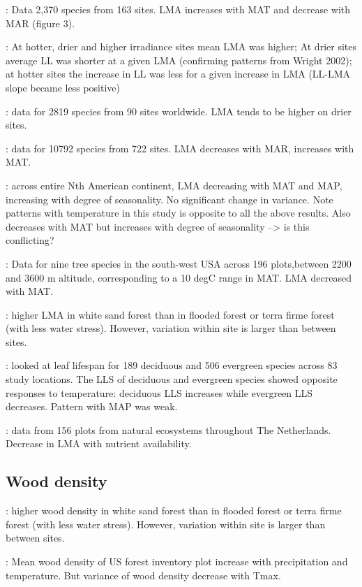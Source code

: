\documentclass[a4paper,11pt]{article}
\begin{document}
\citet{Wright-2004}: Data 2,370 species from 163 sites. LMA increases with MAT and decrease with MAR (figure 3).

\citet{Wright-2005}: At hotter, drier and higher irradiance sites mean LMA was higher; At drier sites average LL was shorter at a given LMA (confirming patterns from Wright 2002); at hotter sites the increase in LL was less for a given increase in LMA (LL-LMA slope became less positive)

\citet{Onoda-2011}: data for 2819 species from 90 sites worldwide. LMA tends to be higher on drier sites.

\citet{Moles-2014}: data for 10792 species from 722 sites. LMA decreases with MAR, increases with MAT.

\citet{Simova-2014}: across entire Nth American continent, LMA decreasing with MAT and MAP, increasing with degree of seasonality. No significant change in variance. Note patterns with temperature in this study is opposite to all the above results. Also decreases with MAT but increases with degree of seasonality --> is this conflicting?

\citet{Laughlin-2012}: Data for nine tree species in the south-west USA across 196 plots,between 2200 and 3600 m altitude, corresponding to a 10 degC range in MAT. LMA decreased with MAT.

\citet{Fortunel-2014}: higher LMA  in white sand forest than in flooded forest or terra firme forest (with less water stress). However, variation within site is larger than between sites.

\citet{vanOmmenKloeke-2012}: looked at leaf lifespan for 189 deciduous and 506 evergreen species across 83 study locations. The LLS of deciduous and evergreen species showed opposite responses to temperature: deciduous LLS increases while evergreen LLS decreases. Pattern with MAP was weak.

\citet{Douma-2011}: data from 156 plots from natural ecosystems throughout The Netherlands.  Decrease in LMA with nutrient availability.


\subsection{Wood density}

\citet{Fortunel-2014}: higher wood density in white sand forest than in flooded forest or terra firme forest (with less water stress). However, variation within site is larger than between sites.

\citet{Swenson-2010}: Mean wood density of US forest inventory plot increase with precipitation and temperature. But variance of wood density decrease with Tmax.
\end{document}
